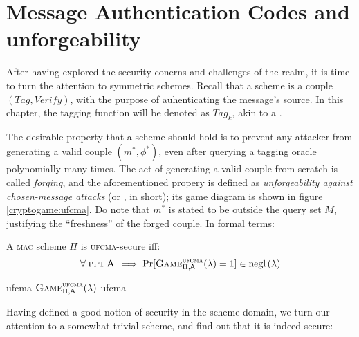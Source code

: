 
\section{Message Authentication Codes and unforgeability}

After having explored the security conerns and challenges of the \ske{} realm, it is time to turn the attention to symmetric \mac{} schemes. Recall that a \mac{} scheme is a couple $(\textit{Tag}, \textit{Verify})$, with the purpose of auhenticating the message's source. In this chapter, the tagging function will be denoted as $\textit{Tag}_k$, akin to a \prf.

The desirable property that a \mac{} scheme should hold is to prevent any attacker from generating a valid couple $(m^*, \phi^*)$, even after querying a tagging oracle polynomially many times\footnotemark. The act of generating a valid couple from scratch is called \emph{forging}, and the aforementioned propery is defined as \emph{unforgeability against chosen-message attacks} (or \ufcma, in short); its game diagram is shown in figure \ref{cryptogame:ufcma}. Do note that $m^*$ is stated to be outside the query set $M$, justifying the ``freshness'' of the forged couple. In formal terms:


\begin{definition}
    A \textsc{mac} scheme $\Pi$ is \textsc{ufcma}-secure iff:
    \[
        \forall\; \ppt\; \adversary\; \implies \Pr[\cryptog{ufcma}(\lambda) = 1] \in \negl{\lambda}  
    \]
\end{definition}

\begin{cryptogame}
    {ufcma}
    {$\cryptog{ufcma}(\lambda)$}
    {ufcma}


    \cseqbeginloop
    \cseqendloop
    
    \cseqdelay

    
\end{cryptogame}

Having defined a good notion of security in the \mac{} scheme domain, we turn our attention to a somewhat trivial scheme, and find out that it is indeed secure:

